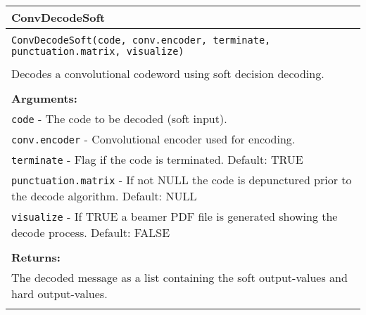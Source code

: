 \begin{longtable}{|p{\textwidth}|}
\hline
\rowcolor{lightblue}ConvDecodeSoft\\
\hline
\\
\texttt{ConvDecodeSoft(code, conv.encoder, terminate, punctuation.matrix, visualize)}\\
\\
Decodes a convolutional codeword using soft decision decoding.\\
\\
\textbf{Arguments:}\\
\texttt{code} - The code to be decoded (soft input).\\
\texttt{conv.encoder} - Convolutional encoder used for encoding.\\
\texttt{terminate} - Flag if the code is terminated. Default: TRUE\\
\texttt{punctuation.matrix} - If not NULL the code is depunctured prior to the decode algorithm. Default: NULL\\
\texttt{visualize} - If TRUE a beamer PDF file is generated showing the decode process. Default: FALSE\\
\\
\textbf{Returns:}\\
The decoded message as a list containing the soft output-values and hard output-values.\\
\\
\hline
\end{longtable}